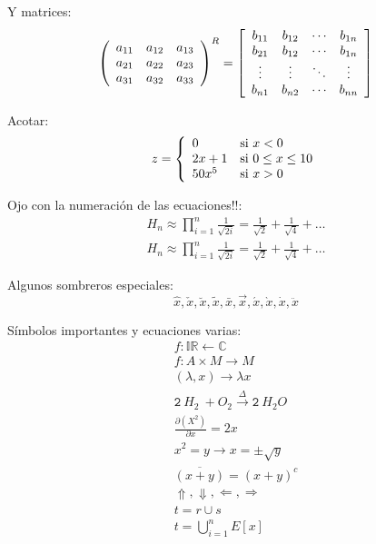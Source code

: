 \documentclass[13 pts]{article}
\theoremstyle{definition}
\begin{document}
Y matrices:
\begin{equation}
  \label{eq:matrices}
  \left (
    \begin{array}[c]{ccc}
      a_{11} & a_{12} & a_{13} \\
      a_{21} & a_{22} & a_{23} \\
      a_{31} & a_{32} & a_{33} 
    \end{array}
  \right )^R
  =
  \left [
    \begin{array}[c]{cccc}
      b_{11} & b_{12} & \cdots & b_{1n} \\
      b_{21} & b_{12} & \cdots & b_{1n} \\
      \vdots & \vdots & \ddots & \vdots \\
      b_{n1} & b_{n2} & \cdots & b_{nn} 
    \end{array}
  \right ]
\end{equation}

Acotar:
\begin{equation}
  \label{eq:acotar}
  z =
  \left\{
    \begin{array}[c]{ll}
      0       & \mbox{si \(x < 0\)} \\
      2x + 1  & \mbox{si \(0 \le x \le 10\)} \\
      50x^5   & \mbox{si \(x > 0\)} \\
    \end{array}
  \right.
\end{equation}

Ojo con la numeración de las ecuaciones!!:
\begin{eqnarray}
  H_n \approx \prod_{i=1}^n \frac{1}{\sqrt{2i}} = \frac{1}{\sqrt{2}}
  + \frac{1}{\sqrt{4}} +  \dots \nonumber \\
  H_n \approx \prod_{i=1}^n \frac{1}{\sqrt{2i}} =  \frac{1}{\sqrt{2}} + 
  \frac{1}{\sqrt{4}} +  \dots 
\end{eqnarray}

Algunos sombreros especiales:
\[\hat{x}, \check{x}, \breve{x}, \tilde{x}, \bar{x}, \vec{x}, \acute{x}, \grave{x}, \dot{x}, \ddot{x}\]


Símbolos importantes y ecuaciones varias:
\begin{eqnarray*} 
  f: \mathbb{IR} \leftarrow \mathbb{C} \\
  f:A \times M \rightarrow M \\
  (\lambda, x) \longrightarrow \lambda x  \\
  \texttt{2}\>H_2\>+ O_2 \stackrel{\Delta}{\rightarrow} \texttt{2}\>H_2O\\
  \frac{\partial(X^2)}{\partial x} = 2x\\
  x^2 = y \longrightarrow x = \pm \sqrt{y}\\
  \overline{(x+y)} = (x+y)^c\\
  \Uparrow,\Downarrow, \Leftarrow, \Rightarrow\\
  t = r \cup s  \\
  t = \bigcup_{i=1}^n E[x]\\
\end{eqnarray*}
\end{document}
